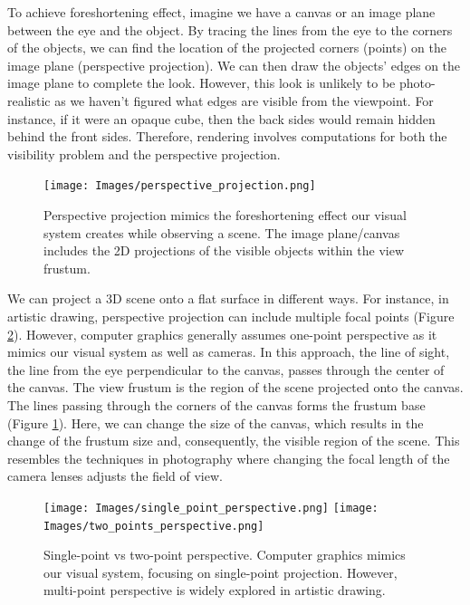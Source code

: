 To achieve foreshortening effect, imagine we have a canvas or an image plane between the eye and the object. By tracing the lines from the eye to the corners of the objects, we can find the location of the projected corners (points) on the image plane (perspective projection). We can then draw the objects' edges on the image plane to complete the look. However, this look is unlikely to be photo-realistic as we haven't figured what edges are visible from the viewpoint. For instance, if it were an opaque cube, then the back sides would remain hidden behind the front sides. Therefore, rendering involves computations for both the visibility problem and the perspective projection. 

\begin{figure}[h]
  \centering
   \texttt{[image: Images/perspective\_projection.png]}
   \caption{Perspective projection mimics the foreshortening effect our visual system creates while observing a scene. The image plane/canvas includes the 2D projections of the visible objects within the view frustum.}
   \label{fig:perspective_projection}
\end{figure}


We can project a 3D scene onto a flat surface in different ways. For instance, in artistic drawing, perspective projection can include multiple focal points (Figure \ref{fig:artistic_drawing}). However, computer graphics generally assumes one-point perspective as it mimics our visual system as well as cameras. In this approach, the line of sight, the line from the eye perpendicular to the canvas, passes through the center of the canvas. The view frustum is the region of the scene projected onto the canvas. The lines passing through the corners of the canvas forms the frustum base (Figure \ref{fig:perspective_projection}). Here, we can change the size of the canvas, which results in the change of the frustum size and, consequently, the visible region of the scene. This resembles the techniques in photography where changing the focal length of the camera lenses adjusts the field of view.

\begin{figure}[h]
  \centering
   \texttt{[image: Images/single\_point\_perspective.png]}
    \texttt{[image: Images/two\_points\_perspective.png]}

   \caption{Single-point vs two-point perspective. Computer graphics mimics our visual system, focusing on single-point projection. However, multi-point perspective is widely explored in artistic drawing.}
   \label{fig:artistic_drawing}
\end{figure}


